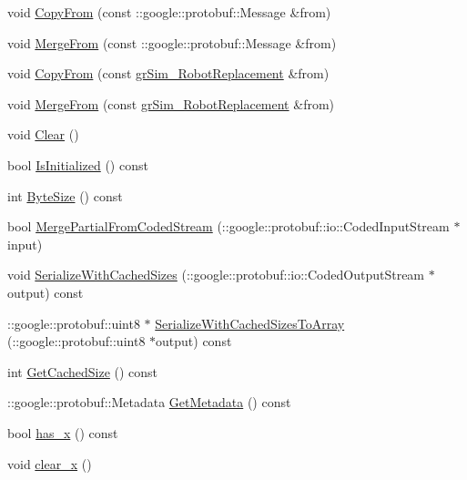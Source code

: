 \begin{DoxyCompactItemize}
\item 
void \hyperlink{classgr_sim___robot_replacement_abd25c6b5ba19f1e11ea56dae946e7a6f}{Copy\-From} (const \-::google\-::protobuf\-::\-Message \&from)
\item 
void \hyperlink{classgr_sim___robot_replacement_ac312a830048d8b011c9c4901dbc7ea41}{Merge\-From} (const \-::google\-::protobuf\-::\-Message \&from)
\item 
void \hyperlink{classgr_sim___robot_replacement_a108db5ba3993d91144512a5f9d110925}{Copy\-From} (const \hyperlink{classgr_sim___robot_replacement}{gr\-Sim\-\_\-\-Robot\-Replacement} \&from)
\item 
void \hyperlink{classgr_sim___robot_replacement_ae93f17eb6d434a9ed53abedbc76fe494}{Merge\-From} (const \hyperlink{classgr_sim___robot_replacement}{gr\-Sim\-\_\-\-Robot\-Replacement} \&from)
\item 
void \hyperlink{classgr_sim___robot_replacement_a3fa38079778fcb83e2ef0317670c7595}{Clear} ()
\item 
bool \hyperlink{classgr_sim___robot_replacement_ae0fdee28b98a9abd4ea6896f37d2dc48}{Is\-Initialized} () const 
\item 
int \hyperlink{classgr_sim___robot_replacement_a1a61cefedd02bd3aec5b93292fcb39cb}{Byte\-Size} () const 
\item 
bool \hyperlink{classgr_sim___robot_replacement_a983773a74737fcb786a48250ffc241f3}{Merge\-Partial\-From\-Coded\-Stream} (\-::google\-::protobuf\-::io\-::\-Coded\-Input\-Stream $\ast$input)
\item 
void \hyperlink{classgr_sim___robot_replacement_a94c3a895db30959d95d94abb04565f18}{Serialize\-With\-Cached\-Sizes} (\-::google\-::protobuf\-::io\-::\-Coded\-Output\-Stream $\ast$output) const 
\item 
\-::google\-::protobuf\-::uint8 $\ast$ \hyperlink{classgr_sim___robot_replacement_ae097dc6eae9920a4e0f19531c065ca34}{Serialize\-With\-Cached\-Sizes\-To\-Array} (\-::google\-::protobuf\-::uint8 $\ast$output) const 
\item 
int \hyperlink{classgr_sim___robot_replacement_a8ef3ec803d337e149464def14339856a}{Get\-Cached\-Size} () const 
\item 
\-::google\-::protobuf\-::\-Metadata \hyperlink{classgr_sim___robot_replacement_ad21c9286b506a7dbf22ccd35e287db32}{Get\-Metadata} () const 
\item 
bool \hyperlink{classgr_sim___robot_replacement_acfcdd7fc2d61dd9e564572af73821e66}{has\-\_\-x} () const 
\item 
void \hyperlink{classgr_sim___robot_replacement_a21d4da802cb299bb97092e861007f34a}{clear\-\_\-x} ()

\end{DoxyCompactItemize}
